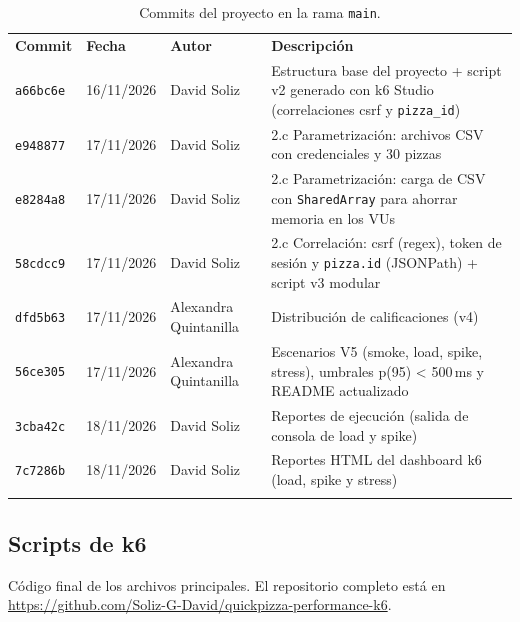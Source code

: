 \documentclass[11pt]{article}
\newcommand{\repoURL}{https://github.com/Soliz-G-David/quickpizza-performance-k6}
\newcommand{\encab}[1]{{\leavevmode\color{white}\sffamily\bfseries #1}}
\renewcommand{\toprule}{\arrayrulecolor{ucbazul}\specialrule{0.8pt}{0pt}{0pt}\arrayrulecolor{black}}
\renewcommand{\midrule}{\arrayrulecolor{ucbazul}\specialrule{0.4pt}{0pt}{0pt}\arrayrulecolor{black}}
\renewcommand{\bottomrule}{\arrayrulecolor{acento}\specialrule{1.2pt}{0pt}{0pt}\arrayrulecolor{black}}
\begin{document}
\begin{table}[H]
\centering
\caption{Commits del proyecto en la rama \texttt{main}.}
\begin{tabularx}{\textwidth}{l l l >{\raggedright\arraybackslash}X}
\toprule
\rowcolor{ucbazul}
\encab{Commit} & \encab{Fecha} & \encab{Autor} & \encab{Descripción} \\
\midrule
\texttt{a66bc6e} & 16/11/2026 & David Soliz & Estructura base del proyecto + script v2 generado con k6 Studio (correlaciones csrf y \texttt{pizza\_id}) \\
\texttt{e948877} & 17/11/2026 & David Soliz & [Paso 1] 2.c Parametrización: archivos CSV con credenciales y 30 pizzas \\
\texttt{e8284a8} & 17/11/2026 & David Soliz & [Paso 1] 2.c Parametrización: carga de CSV con \texttt{SharedArray} para ahorrar memoria en los VUs \\
\texttt{58cdcc9} & 17/11/2026 & David Soliz & [Paso 2] 2.c Correlación: csrf (regex), token de sesión y \texttt{pizza.id} (JSONPath) + script v3 modular \\
\texttt{dfd5b63} & 17/11/2026 & Alexandra Quintanilla & Distribución de calificaciones (v4) \\
\texttt{56ce305} & 17/11/2026 & Alexandra Quintanilla & Escenarios V5 (smoke, load, spike, stress), umbrales p(95) < 500\,ms y README actualizado \\
\texttt{3cba42c} & 18/11/2026 & David Soliz & Reportes de ejecución (salida de consola de load y spike) \\
\texttt{7c7286b} & 18/11/2026 & David Soliz & Reportes HTML del dashboard k6 (load, spike y stress) \\
\bottomrule
\end{tabularx}
\end{table}

\subsection{Scripts de k6}

Código final de los archivos principales. El repositorio completo está en
\url{\repoURL}.
\end{document}
